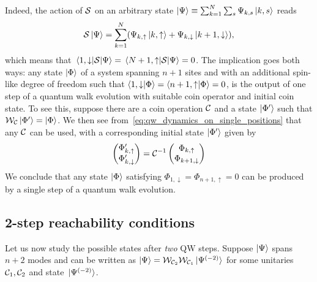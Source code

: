 Indeed, the action of ${\mathcal{S}}$ on an arbitrary state
$\ket\Psi\equiv\sum_{k=1}^N \sum_s \Psi_{k,s}\ket{k,s}$ reads
\begin{equation}
    {\mathcal{S}}\ket\Psi =
    \sum_{k=1}^N (\Psi_{k,\uparrow}\ket{k,\uparrow} + \Psi_{k,\downarrow}\ket{k+1,\downarrow}),
\end{equation}
which means that $\mel{1,\downarrow}{{\mathcal{S}}}{\Psi}=\mel{N+1,\uparrow}{{\mathcal{S}}}{\Psi}=0$.
The implication goes both ways: any state $\ket\Phi$ of a system spanning $n+1$ sites and with an additional spin-like degree of freedom such that
$
\braket{1, \downarrow}{\Phi} =
\braket{n+1, \uparrow}{\Phi} = 0
$,
is the output of one step of a quantum walk evolution with suitable coin operator and initial coin state.
To see this, suppose there are a coin operation ${\mathcal{C}}$ and a state $\ket{\Phi'}$ such that ${\mathcal{W}}_{\mathcal{C}}\ket{\Phi'}=\ket{\Phi}$.
We then see from~\cref{eq:qw_dynamics_on_single_positions} that any ${\mathcal{C}}$ can be used, with a corresponding initial state $\ket{\Phi'}$ given by
\begin{equation}
    \begin{pmatrix}
        \Phi'_{k,\uparrow} \\
        \Phi'_{k,\downarrow}
    \end{pmatrix} = {\mathcal{C}}^{-1}
    \begin{pmatrix}
        \Phi_{k,\uparrow} \\
        \Phi_{k+1,\downarrow}
    \end{pmatrix}
\end{equation}
We conclude that any state $\ket\Phi$ satisfying $\Phi_{1,\downarrow}=\Phi_{n+1,\uparrow}=0$ can be produced by a single step of a quantum walk evolution.

\subsection{2-step reachability conditions}
\label{sec:2step_reachability}
Let us now study the possible states after \textit{two} \ac{QW} steps.
Suppose $\ket\Psi$ spans $n+2$ modes and can be written as
$\ket\Psi={\mathcal{W}}_{{\mathcal{C}}_2}{\mathcal{W}}_{{\mathcal{C}}_1}\ket*{\Psi^{(-2)}}$
for some unitaries ${\mathcal{C}}_1,{\mathcal{C}}_2$ and state $\ket*{\Psi^{(-2)}}$.


